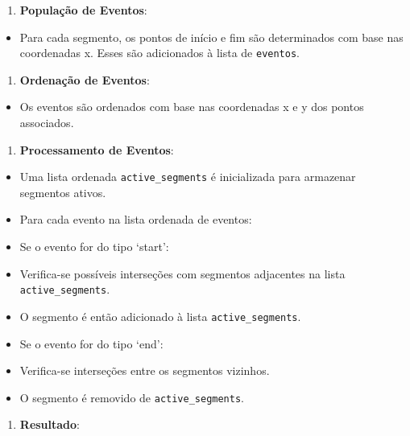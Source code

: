 \documentclass[11pt]{article}
\providecommand{\tightlist}{%
      \setlength{\itemsep}{0pt}\setlength{\parskip}{0pt}}
\begin{document}
\begin{enumerate}
\def\labelenumi{\arabic{enumi}.}
\setcounter{enumi}{1}
\tightlist
\item
  \textbf{População de Eventos}:
\end{enumerate}

\begin{itemize}
\tightlist
\item
  Para cada segmento, os pontos de início e fim são determinados com
  base nas coordenadas x. Esses são adicionados à lista de
  \texttt{eventos}.
\end{itemize}

\begin{enumerate}
\def\labelenumi{\arabic{enumi}.}
\setcounter{enumi}{2}
\tightlist
\item
  \textbf{Ordenação de Eventos}:
\end{enumerate}

\begin{itemize}
\tightlist
\item
  Os eventos são ordenados com base nas coordenadas x e y dos pontos
  associados.
\end{itemize}

\begin{enumerate}
\def\labelenumi{\arabic{enumi}.}
\setcounter{enumi}{3}
\tightlist
\item
  \textbf{Processamento de Eventos}:
\end{enumerate}

\begin{itemize}
\tightlist
\item
  Uma lista ordenada \texttt{active\_segments} é inicializada para
  armazenar segmentos ativos.
\item
  Para cada evento na lista ordenada de eventos:
\item
  Se o evento for do tipo `start':
\item
  Verifica-se possíveis interseções com segmentos adjacentes na lista
  \texttt{active\_segments}.
\item
  O segmento é então adicionado à lista \texttt{active\_segments}.
\item
  Se o evento for do tipo `end':
\item
  Verifica-se interseções entre os segmentos vizinhos.
\item
  O segmento é removido de \texttt{active\_segments}.
\end{itemize}

\begin{enumerate}
\def\labelenumi{\arabic{enumi}.}
\setcounter{enumi}{4}
\tightlist
\item
  \textbf{Resultado}:
\end{enumerate}
\end{document}
